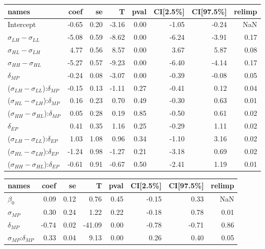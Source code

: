 \begin{tabular}{lrrrrrrr}
\toprule
                                      names &  coef &   se &     T &  pval &  CI[2.5\%] &  CI[97.5\%] &  relimp \\
\midrule
                                  Intercept & -0.65 & 0.20 & -3.16 &  0.00 &      -1.05 &       -0.24 &     NaN \\
                $\sigma_{LH} - \sigma_{LL}$ & -5.08 & 0.59 & -8.62 &  0.00 &      -6.24 &       -3.91 &    0.17 \\
                $\sigma_{HL} - \sigma_{LH}$ &  4.77 & 0.56 &  8.57 &  0.00 &       3.67 &        5.87 &    0.08 \\
                $\sigma_{HH} - \sigma_{HL}$ & -5.27 & 0.57 & -9.23 &  0.00 &      -6.40 &       -4.14 &    0.17 \\
                              $\delta_{MP}$ & -0.24 & 0.08 & -3.07 &  0.00 &      -0.39 &       -0.08 &    0.05 \\
($\sigma_{LH} - \sigma_{LL}$):$\delta_{MP}$ & -0.15 & 0.13 & -1.11 &  0.27 &      -0.41 &        0.12 &    0.04 \\
($\sigma_{HL} - \sigma_{LH}$):$\delta_{MP}$ &  0.16 & 0.23 &  0.70 &  0.49 &      -0.30 &        0.63 &    0.01 \\
($\sigma_{HH} - \sigma_{HL}$):$\delta_{MP}$ &  0.05 & 0.28 &  0.19 &  0.85 &      -0.50 &        0.61 &    0.02 \\
                              $\delta_{EP}$ &  0.41 & 0.35 &  1.16 &  0.25 &      -0.29 &        1.11 &    0.02 \\
($\sigma_{LH} - \sigma_{LL}$):$\delta_{EP}$ &  1.03 & 1.08 &  0.96 &  0.34 &      -1.10 &        3.16 &    0.02 \\
($\sigma_{HL} - \sigma_{LH}$):$\delta_{EP}$ & -1.24 & 0.98 & -1.27 &  0.21 &      -3.18 &        0.69 &    0.02 \\
($\sigma_{HH} - \sigma_{HL}$):$\delta_{EP}$ & -0.61 & 0.91 & -0.67 &  0.50 &      -2.41 &        1.19 &    0.01 \\
\bottomrule
\end{tabular}


\begin{tabular}{lrrrrrrr}
\toprule
                      names &  coef &   se &      T &  pval &  CI[2.5\%] &  CI[97.5\%] &  relimp \\
\midrule
                $\beta_{0}$ &  0.09 & 0.12 &   0.76 &  0.45 &      -0.15 &        0.33 &     NaN \\
              $\sigma_{MP}$ &  0.30 & 0.24 &   1.22 &  0.22 &      -0.18 &        0.78 &    0.01 \\
              $\delta_{MP}$ & -0.74 & 0.02 & -41.09 &  0.00 &      -0.78 &       -0.71 &    0.86 \\
$\sigma_{MP}$:$\delta_{MP}$ &  0.33 & 0.04 &   9.13 &  0.00 &       0.26 &        0.40 &    0.05 \\
\bottomrule
\end{tabular}
